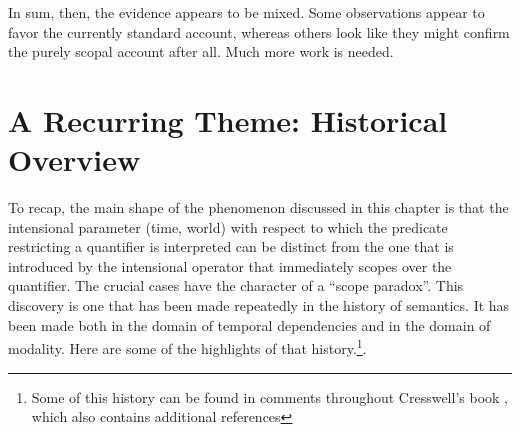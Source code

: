 In sum, then, the evidence appears to be mixed. Some observations appear to favor the currently standard account, whereas others look like they might confirm the purely scopal account after all. Much more work is needed.

\section{A Recurring Theme: Historical Overview}

To recap, the main shape of the phenomenon discussed in this chapter is that the intensional parameter (time, world) with respect to which the predicate restricting a quantifier is interpreted can be distinct from the one that is introduced by the intensional operator that immediately scopes over the quantifier. The crucial cases have the character of a ``scope paradox''. This discovery is one that has been made repeatedly in the history of semantics. It has been made both in the domain of temporal dependencies and in the domain of modality. Here are some of the highlights of that history.\footnote{Some of this history can be found in comments throughout Cresswell's book \citep{cresswell:entities}, which also contains additional references}.

